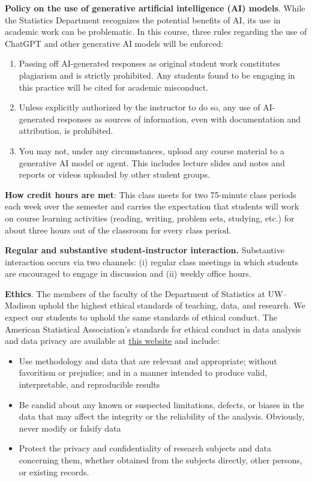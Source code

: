 \documentclass[11pt]{article}
\begin{document}
\textbf{Policy on the use of generative artificial intelligence (AI) models}.
While the Statistics Department recognizes the potential benefits of AI, its use in academic work can be problematic. In this course, three rules regarding the use of ChatGPT and other generative AI models will be enforced: 
\begin{enumerate}
\item{Passing off AI-generated responses as original student work constitutes plagiarism and is strictly prohibited. Any students found to be engaging in this practice will be cited for academic misconduct.}
\item{Unless explicitly authorized by the instructor to do so, any use of AI-generated responses as sources of information, even with documentation and attribution, is prohibited.}
\item{You may not, under any circumstances, upload any course material to a generative AI model or agent. This includes lecture slides and notes and reports or videos uploaded by other student groups.}
\end{enumerate}

\textbf{How credit hours are met}: This class meets for two 75-minute class periods each week over the semester and carries the expectation that students will work on course learning activities (reading, writing, problem sets, studying, etc.) for about three hours out of the classroom for every class period.

\textbf{Regular and substantive student-instructor interaction.} Substantive interaction occurs via two channels: (i) regular class meetings in which students are encouraged to engage in discussion and (ii) weekly office hours.

\textbf{Ethics}. The members of the faculty of the Department of Statistics at UW--Madison uphold the highest ethical standards of teaching, data, and research. We expect our students to uphold the same standards of ethical conduct. 
The American Statistical Association's standards for ethical conduct in data analysis and data privacy are available at \href{https://www.amstat.org/your-career/ethical-guidelines-for-statistical-practice}{this website} and include:
\begin{itemize}
\item{Use methodology and data that are relevant and appropriate; without favoritism or prejudice; and in a manner intended to produce valid, interpretable, and reproducible results}
\item{Be candid about any known or suspected limitations, defects, or biases in the data that may affect the integrity or the reliability of the analysis. Obviously, never modify or falsify data}
\item{Protect the privacy and confidentiality of research subjects and data concerning them, whether obtained from the subjects directly, other persons, or existing records.}
\end{itemize}
\end{document}
